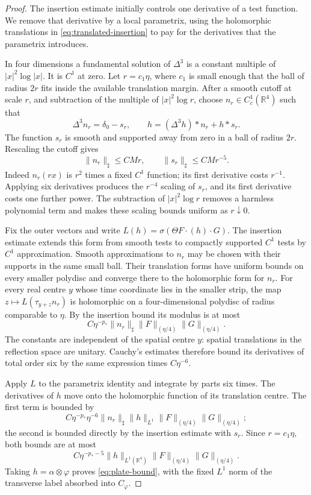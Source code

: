 \documentclass[11pt,letterpaper,reqno]{amsart}
\theoremstyle{definition}
\theoremstyle{remark}
\newcommand{\R}{\mathbb R}
\begin{document}
\begin{proof}
The insertion estimate initially controls one derivative of a test
function. We remove that derivative by a local parametrix, using the
holomorphic translations in \eqref{eq:translated-insertion} to pay for
the derivatives that the parametrix introduces.

In four dimensions a fundamental solution of $\Delta^3$ is a constant
multiple of $|x|^2\log|x|$. It is $C^1$ at zero. Let $r=c_1\eta$,
where $c_1$ is small enough that the ball of radius $2r$ fits inside
the available translation margin. After a smooth cutoff at scale $r$,
and subtraction of the multiple of $|x|^2\log r$, choose
$n_r\in C_c^1(\R^4)$ such that
\[
 \Delta^3 n_r=\delta_0-s_r,
 \qquad
 h=(\Delta^3h)*n_r+h*s_r.
\]
The function $s_r$ is smooth and supported away from zero in a ball
of radius $2r$. Rescaling the cutoff gives
\[
 \|n_r\|_\sharp\le CMr,\qquad
 \|s_r\|_\sharp\le CMr^{-5}.
\]
Indeed $n_r(rx)$ is $r^2$ times a fixed $C^1$ function; its first
derivative costs $r^{-1}$. Applying six derivatives produces the
$r^{-4}$ scaling of $s_r$, and its first derivative costs one further
power. The subtraction of $|x|^2\log r$ removes a harmless polynomial
term and makes these scaling bounds uniform as $r\downarrow0$.

Fix the outer vectors and write $L(h)=\sigma(\Theta F\cdot(h)\cdot G)$.
The insertion estimate extends this form from smooth tests to compactly
supported $C^1$ tests by $C^1$ approximation. Smooth approximations to
$n_r$ may be chosen with their supports in the same small ball. Their
translation forms have uniform bounds on every smaller polydisc and
converge there to the holomorphic form for $n_r$.
For every real centre $y$ whose time coordinate lies in the smaller
strip, the map $z\mapsto L(\tau_{y+z}n_r)$ is holomorphic on a
four-dimensional polydisc of radius comparable to $\eta$.
By the insertion bound its modulus is at most
\[
 C\eta^{-p_*}\|n_r\|_\sharp
                 \|F\|_{(\eta/4)}\|G\|_{(\eta/4)}.
\]
The constants are independent of the spatial centre $y$: spatial
translations in the reflection space are unitary. Cauchy's estimates
therefore bound its derivatives of total order six by the same
expression times $C\eta^{-6}$.

Apply $L$ to the parametrix identity and integrate by parts six times.
The derivatives of $h$ move onto the holomorphic function of its
translation centre. The first term is bounded by
\[
 C\eta^{-p_*}\eta^{-6}\|n_r\|_\sharp\|h\|_{L^1}
                 \|F\|_{(\eta/4)}\|G\|_{(\eta/4)};
\]
the second is bounded directly by the insertion estimate with $s_r$.
Since $r=c_1\eta$, both bounds are at most
\[
 C\eta^{-p_*-5}\|h\|_{L^1(\R^4)}
                 \|F\|_{(\eta/4)}\|G\|_{(\eta/4)}.
\]
Taking $h=\alpha\otimes\varphi$ proves \eqref{eq:plate-bound},
with the fixed $L^1$ norm of the transverse label absorbed into
$C_\varphi$.


\end{proof}
\end{document}
